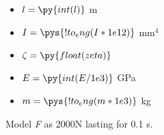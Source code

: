 \documentclass[a4paper,11pt]{article}
\begin{document}
\begin{itemize} %
	\item $l = \py{int(l)}$ m
	\item $I = \pys{!{to_eng(I*1e12)}}$ mm$^4$
	\item $\zeta = \py{float(zeta)}$
	\item $E = \py{int(E/1e3)}$ GPa
	\item $m = \pys{!{to_eng(m*1e3)}}$ kg
\end{itemize}

Model \emph{F} as 2000N lasting for 0.1 s.

%
%	
%	
%	
%	
%	
%	
%	
%	
\end{document}
